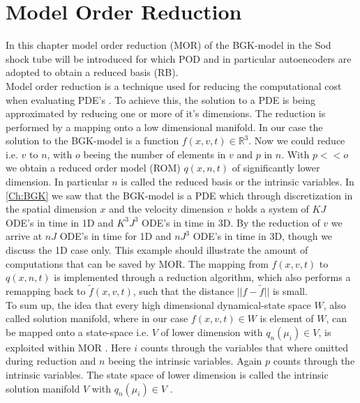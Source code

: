
\chapter{Model Order Reduction}
\label{Ch:ROM}


In this chapter model order reduction (MOR) of the BGK-model in the Sod shock tube will be introduced for which POD and in particular autoencoders are adopted to obtain a reduced basis (RB).\\
Model order reduction is a technique used for reducing the computational cost when evaluating PDE's \cite{Bernard}\cite{Carlberg}\cite{ohlberger2015reduced}. To achieve this, the solution to a PDE is being approximated by reducing one or more of it's dimensions. The reduction is performed by a mapping onto a low dimensional manifold. In our case the solution to the BGK-model is a function \(f(x,v,t) \in \mathbb{R}^3\). Now we could reduce i.e. \(v\) to \(n\), with \(o\) beeing the number of elements in \(v\) and \(p\) in \(n\). With \(p << o\) we obtain a reduced order model (ROM) \(q(x,n,t)\) of significantly lower dimension. In particular \(n\) is called the reduced basis or the intrinsic variables. In \cref{Ch:BGK} we saw that the BGK-model is a PDE which through discretization in the spatial dimension \(x\) and the velocity dimension \(v\) holds a system of \(KJ\) ODE's in time in 1D and \(K^3J^3\) ODE's in time in 3D.  By the reduction of \(v\) we arrive at \(nJ\) ODE's in time for 1D and \(nJ^3\) ODE's in time in 3D, though we discuss the 1D case only. This example should illustrate the amount of computations that can be saved by MOR. The mapping from \(f(x,v,t)\) to \(q(x,n,t)\) is implemented through a reduction algorithm, which also performs a remapping back to \(\tilde{f}(x,v,t)\), such that the distance \(||f - \tilde{f}||\) is small.\\
To sum up, the idea that every high dimensional dynamical-state space \(W\), also called solution manifold, where in our case \(f(x,v,t) \in W\) is element of \(W\), can be mapped onto a state-space i.e. \(V\) of lower dimension with \(q_n(\mu_i) \in V\), is exploited within MOR \cite{ohlberger2015reduced}. Here \(i\) counts through the variables that where omitted during reduction and \(n\) beeing the intrinsic variables. Again \(p\) counts through the intrinsic variables. The state space of lower dimension is called the intrinsic solution manifold \(V\) with \(q_n(\mu_i) \in V\) \cite{Carlberg}.\\
